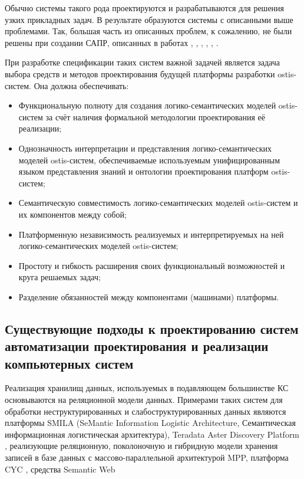 Обычно системы такого рода проектируются и разрабатываются для решения узких прикладных задач. В результате образуются системы с описанными выше проблемами. Так, большая часть из описанных проблем, к сожалению, не были решены при создании САПР, описанных в работах \cite{lenat1990cyc}, \cite{reed2002mapping}, \cite{Gomolkaa2022}, \cite{Gribova2018}, \cite{Filippov2016}, \cite{Zagorulko2015}.

При разработке спецификации таких систем важной задачей является задача выбора средств и методов проектирования
будущей платформы разработки ostis-систем. Она должна обеспечивать:

\begin{itemize}
    \item Функциональную полноту для создания логико-семантических моделей ostis-систем за счёт наличия формальной
    методологии проектирования её реализации;
    \item Однозначность интерпретации и представления логико-семантических моделей ostis-систем, обеспечиваемые
    используемым унифицированным языком представления знаний и онтологии проектирования платформ ostis-систем;
    \item Семантическую совместимость логико-семантических моделей ostis-систем и их компонентов между собой;
    \item Платформенную независимость реализуемых и интерпретируемых на ней логико-семантических моделей ostis-систем;
    \item Простоту и гибкость расширения своих функциональный возможностей и круга решаемых задач;
    \item Разделение обязанностей между компонентами (машинами) платформы.
\end{itemize}

\subsection{Существующие подходы к проектированию систем автоматизации проектирования и реализации компьютерных систем}

Реализация хранилищ данных, используемых в подавляющем большинстве КС основываются на реляционной модели данных. Примерами таких систем для обработки неструктурированных и слабоструктурированных данных являются платформы SMILA (SeMantic Information Logistic Architecture, Семантическая информационная логистическая архитектура), Teradata Aster Discovery Platform \cite{ballinger2009teradata}, реализующие реляционную, поколоночную и гибридную модели хранения записей в базе данных с массово-параллельной архитектурой MPP, платформа CYC \cite{CycPlatform2022}, средства Semantic Web \cite{sem_web}

